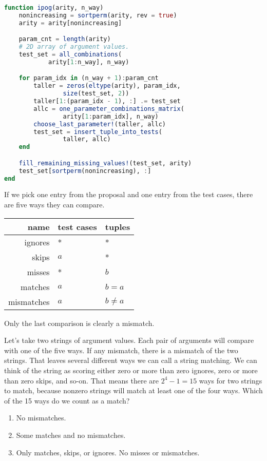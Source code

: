 \documentclass{juliacon}
\begin{document}
\begin{lstlisting}[language=Julia]
function ipog(arity, n_way)
    nonincreasing = sortperm(arity, rev = true)
    arity = arity[nonincreasing]

    param_cnt = length(arity)
    # 2D array of argument values.
    test_set = all_combinations(
            arity[1:n_way], n_way)

    for param_idx in (n_way + 1):param_cnt
        taller = zeros(eltype(arity), param_idx,
                size(test_set, 2))
        taller[1:(param_idx - 1), :] .= test_set
        allc = one_parameter_combinations_matrix(
                arity[1:param_idx], n_way)
        choose_last_parameter!(taller, allc)
        test_set = insert_tuple_into_tests(
                taller, allc)
    end

    fill_remaining_missing_values!(test_set, arity)
    test_set[sortperm(nonincreasing), :]
end
\end{lstlisting}

If we pick one entry from the proposal and one entry from the test cases, there are five ways they can compare.
\begin{center}
\begin{tabular}{rll}
name & test cases & tuples \\ \hline
ignores & * & * \\
skips & $a$ & * \\
misses & * & $b$ \\
matches & $a$ & $b=a$ \\
mismatches & $a$ & $b\ne a$
\end{tabular}
\end{center}
Only the last comparison is clearly a mismatch.

Let's take two strings of argument values. Each pair of arguments will compare with one of the five ways. If any mismatch, there is a mismatch of the two strings. That leaves several different ways we can call a string matching. We can think of the string as scoring either zero or more than zero ignores, zero or more than zero skips, and so-on. That means there are $2^4-1 = 15$ ways for two strings to match, because nonzero strings will match at least one of the four ways. Which of the 15 ways do we count as a match?

\begin{enumerate}
   \item No mismatches.
   \item Some matches and no mismatches.
   \item Only matches, skips, or ignores. No misses or mismatches.
\end{enumerate}
\end{document}
